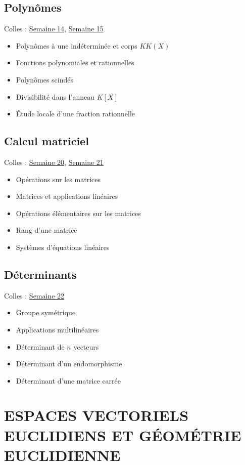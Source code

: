 \subsection{Polyn\^omes}
Colles : \href{S14.pdf}{Semaine 14}, \href{S15.pdf}{Semaine 15}
\begin{itemize}
\item Polyn\^omes \`a une ind\'etermin\'ee et corps $KK(X)$
\item Fonctions polynomiales et rationnelles
\item Polyn\^omes scind\'es
\item Divisibilit\'e dans l'anneau $K[X]$
\item \'Etude locale d'une fraction rationnelle
\end{itemize}

\subsection{Calcul matriciel}
Colles : \href{S20.pdf}{Semaine 20}, \href{S21.pdf}{Semaine 21}
\begin{itemize}
\item Op\'erations sur les matrices
\item Matrices et applications lin\'eaires
\item Op\'erations \'el\'ementaires sur les matrices
\item Rang d'une matrice
\item Syst\`emes d'\'equations lin\'eaires
\end{itemize}

\subsection{D\'eterminants}
Colles : \href{S22.pdf}{Semaine 22}
\begin{itemize}
\item Groupe sym\'etrique
\item Applications multilin\'eaires
\item D\'eterminant de $n$ vecteurs
\item D\'eterminant d'un endomorphisme
\item D\'eterminant d'une matrice carr\'ee
\end{itemize}

\section{ESPACES VECTORIELS EUCLIDIENS ET G\'EOM\'ETRIE
EUCLIDIENNE}

